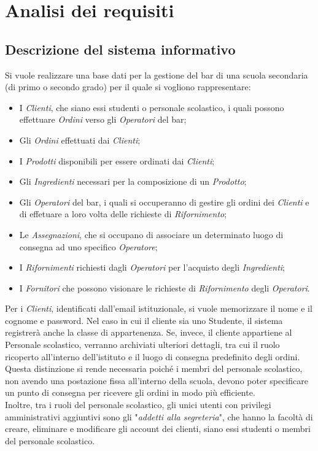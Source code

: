 \documentclass[12pt,a4paper]{article}
\begin{document}
    \section{Analisi dei requisiti}
    \subsection{Descrizione del sistema informativo}
    \label{par:Descrizione del sistema informativo}
    Si vuole realizzare una base dati per la gestione del bar di una scuola secondaria (di primo o secondo grado) per il quale si vogliono rappresentare:
    \begin{itemize}[leftmargin=1em]
        \item I \textit{Clienti}, che siano essi studenti o personale scolastico, i quali possono effettuare \textit{Ordini} verso gli \textit{Operatori} del bar;
        \item Gli \textit{Ordini} effettuati dai \textit{Clienti};
        \item I \textit{Prodotti} disponibili per essere ordinati dai \textit{Clienti};
        \item Gli \textit{Ingredienti} necessari per la composizione di un \textit{Prodotto};
        \item Gli \textit{Operatori} del bar, i quali si occuperanno di gestire gli ordini dei \textit{Clienti} e di effetuare a loro volta delle richieste di \textit{Rifornimento};
        \item Le \textit{Assegnazioni}, che si occupano di associare un determinato luogo di consegna ad uno specifico \textit{Operatore};
        \item I \textit{Rifornimenti} richiesti dagli \textit{Operatori} per l'acquisto degli \textit{Ingredienti};
        \item I \textit{Fornitori} che possono visionare le richieste di \textit{Rifornimento} degli \textit{Operatori}.
    \end{itemize}

    \vspace{8pt}
    \noindent
    Per i \textit{Clienti}, identificati dall'email istituzionale, si vuole memorizzare il nome e il cognome e password. Nel caso in cui il cliente sia uno Studente, il sistema registrerà anche la classe di appartenenza. Se, invece, il cliente appartiene al Personale scolastico, verranno archiviati ulteriori dettagli, tra cui il ruolo ricoperto all'interno dell'istituto e il luogo di consegna predefinito degli ordini. Questa distinzione si rende necessaria poiché i membri del personale scolastico, non avendo una postazione fissa all'interno della scuola, devono poter specificare un punto di consegna per ricevere gli ordini in modo più efficiente.\\
    Inoltre, tra i ruoli del personale scolastico, gli unici utenti con privilegi amministrativi aggiuntivi sono gli "\textit{addetti alla segreteria}", che hanno la facoltà di creare, eliminare e modificare gli account dei clienti, siano essi studenti o membri del personale scolastico.
\end{document}
